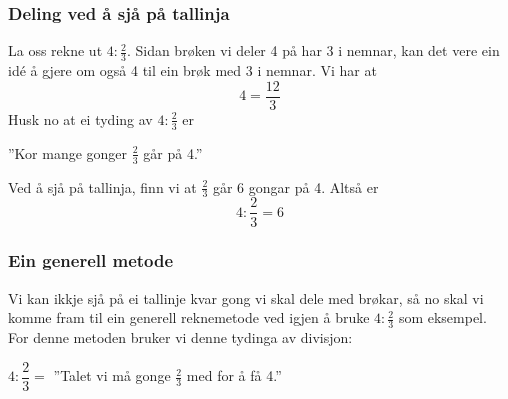 \newpage
\section{\brdelmbr}
\subsubsection{Deling ved å sjå på tallinja}
La oss rekne ut $ 4:\frac{2}{3}  $. Sidan brøken vi deler 4 på har 3 i nemnar, kan det vere ein idé å gjere om også 4 til ein brøk med $ 3 $ i nemnar. Vi har at 
\[ 4=\dfrac{12}{3} \]
Husk no at ei tyding av $ 4:\frac{2}{3} $ er
\begin{center}
	''Kor mange gonger $ \frac{2}{3} $ går på 4.''
\end{center}
Ved å sjå på tallinja, finn vi at $ \frac{2}{3} $ går 6 gongar på 4. Altså er
\[ 4:\frac{2}{3}=6 \]
\newpage
\subsubsection{Ein generell metode}
Vi kan ikkje sjå på ei tallinje kvar gong vi skal dele med brøkar, så no skal vi komme fram til ein generell reknemetode ved igjen å bruke $ 4:\frac{2}{3} $ som eksempel. For denne metoden bruker vi denne tydinga av divisjon:
\begin{center}
	$  4:\dfrac{2}{3}= $ ''Talet vi må gonge $ \frac{2}{3} $ med for å få 4.''
\end{center}

